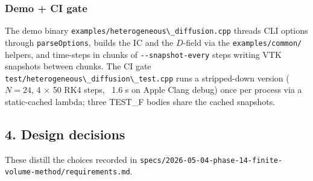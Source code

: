 \subsubsection{Demo + CI gate}\label{phase14-demo}

The demo binary
\passthrough{\lstinline!examples/heterogeneous\_diffusion.cpp!}
threads CLI options through
\passthrough{\lstinline!parseOptions!}, builds the IC and the
\(D\)-field via the
\passthrough{\lstinline!examples/common/!} helpers, and time-steps in
chunks of \passthrough{\lstinline!--snapshot-every!} steps writing
VTK snapshots between chunks. The CI gate
\passthrough{\lstinline!test/heterogeneous\_diffusion\_test.cpp!}
runs a stripped-down version (\(N=24\), 4 \(\times\) 50 RK4 steps,
~1.6 s on Apple Clang debug) once per process via a static-cached
lambda; three TEST\_F bodies share the cached snapshots.

\subsection{4. Design decisions}\label{phase14-decisions}

These distill the choices recorded in
\passthrough{\lstinline!specs/2026-05-04-phase-14-finite-volume-method/requirements.md!}.

